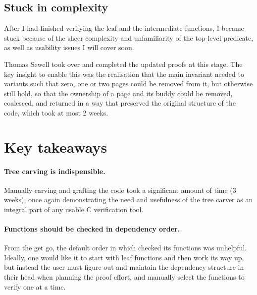 \subsection{Stuck in complexity}

After I had finished verifying the leaf and the intermediate functions, I
became stuck because of the sheer complexity and unfamiliarity of the top-level
predicate, as well as usability issues I will cover soon.

Thomas Sewell took over and completed the updated proofs at this stage. The key
insight to enable this was the realisation that the main invariant needed to
variants such that zero, one or two pages could be removed from it, but
otherwise still hold, so that the ownership of a page and its buddy could be
removed, coalesced, and returned in a way that preserved the original structure
of the code, which took at most 2 weeks.

\section{Key takeaways}


\paragraph{Tree carving is indispensible.} Manually carving and grafting the
code took a significant amount of time (3 weeks), once again demonstrating the
need and usefulness of the tree carver as an integral part of any usable C
verification tool.

\paragraph{Functions should be checked in dependency order.} From the get go,
the default order in which  checked its functions was unhelpful.
Ideally, one would like it to start with leaf functions and then work its way
up, but instead the user must figure out and maintain the dependency structure
in their head when planning the proof effort, and manually select the functions
to verify one at a time.

